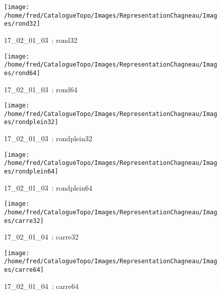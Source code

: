 \documentclass[12pt,titlepage]{book}
\begin{document}
\begin{figure}[h!]
\begin{minipage}[t]{3cm}
\begin{center}
      \texttt{[image: /home/fred/CatalogueTopo/Images/RepresentationChagneau/Images/rond32]}
      \caption[~17\_02\_01\_03]{\small{17\_02\_01\_03~:} \tiny{rond32}}\label{rond32}
    \end{center}
  \end{minipage}
  \begin{minipage}[t]{3cm}
    \begin{center}
      \texttt{[image: /home/fred/CatalogueTopo/Images/RepresentationChagneau/Images/rond64]}
      \caption[~17\_02\_01\_03]{\small{17\_02\_01\_03~:} \tiny{rond64}}\label{rond64}
    \end{center}
  \end{minipage}
  \begin{minipage}[t]{3cm}
    \begin{center}
      \texttt{[image: /home/fred/CatalogueTopo/Images/RepresentationChagneau/Images/rondplein32]}
      \caption[~17\_02\_01\_03]{\small{17\_02\_01\_03~:} \tiny{rondplein32}}\label{rondplein32}
    \end{center}
  \end{minipage}
  \begin{minipage}[t]{3cm}
    \begin{center}
      \texttt{[image: /home/fred/CatalogueTopo/Images/RepresentationChagneau/Images/rondplein64]}
      \caption[~17\_02\_01\_03]{\small{17\_02\_01\_03~:} \tiny{rondplein64}}\label{rondplein64}
    \end{center}
  \end{minipage}
  \begin{minipage}[t]{3cm}
    \begin{center}
      \texttt{[image: /home/fred/CatalogueTopo/Images/RepresentationChagneau/Images/carre32]}
      \caption[~17\_02\_01\_04]{\small{17\_02\_01\_04~:} \tiny{carre32}}\label{carre32}
    \end{center}
  \end{minipage}
  \begin{minipage}[t]{3cm}
    \begin{center}
      \texttt{[image: /home/fred/CatalogueTopo/Images/RepresentationChagneau/Images/carre64]}
      \caption[~17\_02\_01\_04]{\small{17\_02\_01\_04~:} \tiny{carre64}}\label{carre64}

\end{center}
\end{minipage}
\end{figure}
\end{document}
